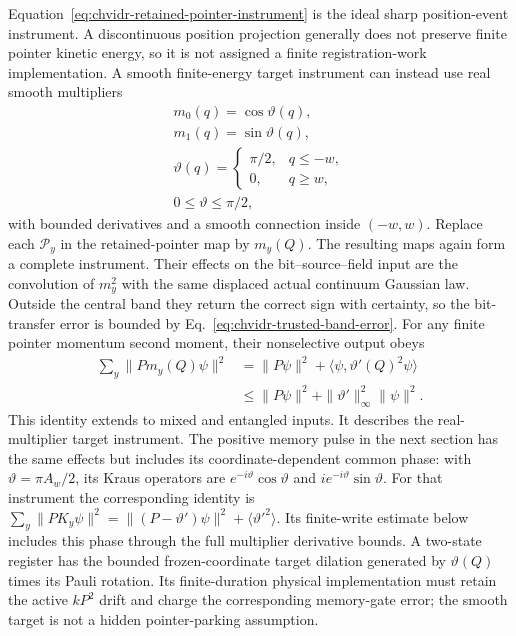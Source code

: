 Equation~\eqref{eq:chvidr-retained-pointer-instrument} is the ideal sharp
position-event instrument. A discontinuous position projection generally
does not preserve finite pointer kinetic energy, so it is not assigned a
finite registration-work implementation. A smooth finite-energy target
instrument can instead use real smooth multipliers
\begin{equation}
\begin{gathered}
m_0(q)=\cos\vartheta(q),\\
 m_1(q)=\sin\vartheta(q),
 \\ \vartheta(q)=
 \begin{cases}\pi/2,&q\leq-w,\\0,&q\geq w,\end{cases}
 \\ 0\leq\vartheta\leq\pi/2,
\end{gathered}
\label{eq:chvidr-smooth-registration}
\end{equation}
with bounded derivatives and a smooth connection inside $(-w,w)$.
Replace each $\mathcal P_y$ in the retained-pointer map by $m_y(Q)$.
The resulting maps again form a complete instrument. Their effects on
the bit--source--field input are the convolution of $m_y^2$ with the
same displaced actual continuum Gaussian law. Outside the central band
they return the correct sign with certainty, so the bit-transfer error
is bounded by Eq.~\eqref{eq:chvidr-trusted-band-error}. For any finite
pointer momentum second moment, their nonselective output obeys
\begin{equation}
\begin{aligned}
 \sum_y\|P m_y(Q)\psi\|^2
 &=\|P\psi\|^2+\langle\psi,\vartheta'(Q)^2\psi\rangle\\
 &\leq\|P\psi\|^2+\|\vartheta'\|_\infty^2\|\psi\|^2.
\end{aligned}
\label{eq:chvidr-smooth-registration-energy}
\end{equation}
This identity extends to mixed and entangled inputs. It describes the
real-multiplier target instrument. The positive memory pulse in the next
section has the same effects but includes its coordinate-dependent common
phase: with $\vartheta=\pi A_w/2$, its Kraus operators are
$e^{-i\vartheta}\cos\vartheta$ and
$i e^{-i\vartheta}\sin\vartheta$. For that instrument the corresponding
identity is
$\sum_y\|PK_y\psi\|^2
=\|(P-\vartheta')\psi\|^2+\langle\vartheta'^2\rangle$.
Its finite-write estimate below includes this phase through the full
multiplier derivative bounds. A two-state register
has the bounded frozen-coordinate target dilation generated by
$\vartheta(Q)$ times its Pauli rotation. Its finite-duration physical
implementation must retain the active $kP^2$ drift and charge the
corresponding memory-gate error; the smooth target is not a hidden
pointer-parking assumption.

